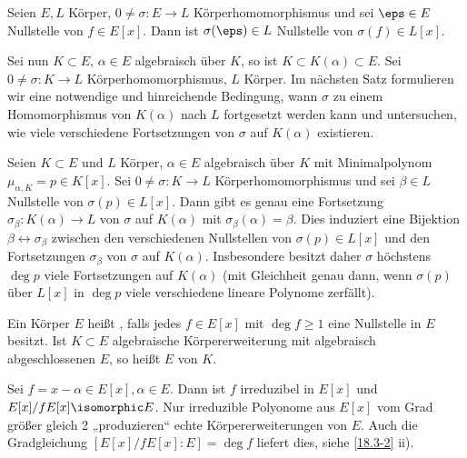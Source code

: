 \begin{lem} \label{18.4-3}
	Seien $E, L$ Körper, $0 \neq \sigma: E \to L$ Körperhomomorphismus und sei $\eps \in E$ Nullstelle von $f \in E[x]$.
	Dann ist $\sigma(\eps) \in L$ Nullstelle von $\sigma(f) \in L[x]$.
\end{lem}

Sei nun $K \subset E$, $\alpha \in E$ algebraisch über $K$, so ist $K \subset K(\alpha) \subset E$.
Sei $0 \neq \sigma: K \to L$ Körperhomomorphismus, $L$ Körper.
Im nächsten Satz formulieren wir eine notwendige und hinreichende Bedingung, wann $\sigma$ zu einem Homomorphismus von $K(\alpha)$ nach $L$ fortgesetzt werden kann und untersuchen, wie viele verschiedene Fortsetzungen von $\sigma$ auf $K(\alpha)$ existieren.

\begin{st} \label{18.4-4}
	Seien $K \subset E$ und $L$ Körper, $\alpha \in E$ algebraisch über $K$ mit Minimalpolynom $\mu_{\alpha, K} = p \in K[x]$.
	Sei $0 \neq \sigma: K \to L$ Körperhomomorphismus und sei $\beta \in L$ Nullstelle von $\sigma(p) \in L[x]$.
	Dann gibt es genau eine Fortsetzung $\sigma_\beta: K(\alpha) \to L$ von $\sigma$ auf $K(\alpha)$ mit $\sigma_\beta(\alpha) = \beta$.
	Dies induziert eine Bijektion $\beta \leftrightarrow \sigma_\beta$ zwischen den verschiedenen Nullstellen von $\sigma(p) \in L[x]$ und den Fortsetzungen $\sigma_\beta$ von $\sigma$ auf $K(\alpha)$.
	Insbesondere besitzt daher $\sigma$ höchstens $\deg p$ viele Fortsetzungen auf $K(\alpha)$ (mit Gleichheit genau dann, wenn $\sigma(p)$ über $L[x]$ in $\deg p$ viele verschiedene lineare Polynome zerfällt).
\end{st}

\begin{df} \label{18.4-5}
	Ein Körper $E$ heißt , falls jedes $f \in E[x]$ mit $\deg f \ge 1$ eine Nullstelle in $E$ besitzt.
	Ist $K \subset E$ algebraische Körpererweiterung mit algebraisch abgeschlossenen $E$, so heißt $E$  von $K$.
\end{df}

\begin{note}
	Sei $f = x - \alpha \in E[x], \alpha \in E$.
	Dann ist $f$ irreduzibel in $E[x]$ und $E[x] / fE[x] \isomorphic E$.
	Nur irreduzible Polyonome aus $E[x]$ vom Grad größer gleich 2 „produzieren“ echte Körpererweiterungen von $E$.
	Auch die Gradgleichung $[E[x] / fE[x] : E] = \deg f$ liefert dies, siehe \ref{18.3-2} ii).
\end{note}


